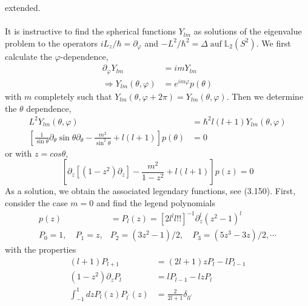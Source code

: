 extended.\\\\
It is instructive to find the spherical functions $Y_{lm}$ as solutions of the eigenvalue problem to the operators $iL_z/\hbar=\partial_{\varphi}$ and $-L^2/\hbar^2=\Delta \operatorname{auf}\mathbb{L}_2(S^2)$. We first calculate the $\varphi$-dependence,
\begin{equation}
\begin{aligned} \partial_{\varphi} Y_{l m} &=i m Y_{l m} \\ \Rightarrow Y_{l m}(\theta, \varphi) &=e^{i m \varphi} p(\theta) \end{aligned}
\end{equation}
with $m$ completely such that $Y_{lm} (\theta, \varphi + 2\pi) = Y_{lm} (\theta, \varphi)$. Then we determine the $\theta$ dependence,
\begin{equation}
\begin{aligned} L^{2} Y_{l m}(\theta, \varphi) &=\hbar^{2} l(l+1) Y_{l m}(\theta, \varphi) \\\left[\frac{1}{\sin \theta} \partial_{\theta} \sin \theta \partial_{\theta}-\frac{m^{2}}{\sin ^{2} \theta}+l(l+1)\right] p(\theta) &=0 \end{aligned}
\end{equation}
or with $z = cos \theta$,
\begin{equation}
    \left[\partial_{z}\left[\left(1-z^{2}\right) \partial_{z}\right]-\frac{m^{2}}{1-z^{2}}+l(l+1)\right] p(z)=0
    \end{equation}
As a solution, we obtain the associated legendary functions, see (3.150). First, consider the case $m = 0$ and find the legend polynomials
\begin{equation}
\begin{aligned} p(z) &=P_{l}(z)=\left[2 l^{l} l ! !\right]^{-1} \partial_{z}^{l}\left(z^{2}-1\right)^{l} \\ P_{0}=1, \quad P_{1}=z, & P_{2}=\left(3 z^{2}-1\right) / 2, \quad P_{3}=\left(5 z^{3}-3 z\right) / 2, \cdots \end{aligned}
\end{equation}
with the properties
\begin{equation}
\begin{aligned}(l+1) P_{l+1} &=(2 l+1) z P_{l}-l P_{l-1} \\\left(1-z^{2}\right) \partial_{z} P_{l} &=l P_{l-1}-l z P_{l} \\ \int_{-1}^{1} d z P_{l}(z) P_{l^{\prime}}(z) &=\frac{2}{2 l+1} \delta_{l l^{\prime}} \end{aligned}
\end{equation}

